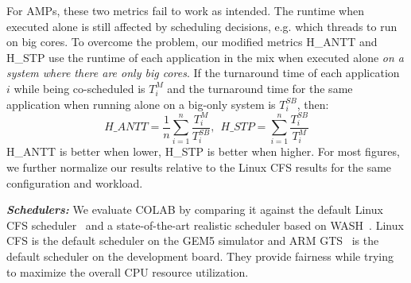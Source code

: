 For AMPs, these two metrics fail to work as intended. The runtime when executed alone is still affected by scheduling decisions, e.g. which threads to run on big cores. To overcome the problem, our modified metrics H\_ANTT and H\_STP use the runtime of each application in the mix when executed alone \emph{on a system where there are only big cores}. If the turnaround time of each application $i$ while being co-scheduled is $T^{M}_i$ and the turnaround time for the same application when running alone on a big-only system is $T^{SB}_i$, then:
$$ H\_ANTT = \frac{1}{n}\sum^{n}_{i=1}\frac{T^{M}_i}{T^{SB}_i}
,\ \ H\_STP = \sum^{n}_{i=1}\frac{T^{SB}_i}{T^{M}_i}$$
H\_ANTT is better when lower, H\_STP is better when higher. For most figures, we further normalize our results relative to the Linux CFS results for the same configuration and workload.

\textbf{\textit{Schedulers:}}
We evaluate COLAB by comparing it against the default Linux CFS scheduler~\cite{molnar2007cfs} and a state-of-the-art realistic scheduler based on WASH~\cite{jibaja2016portable}. 
Linux CFS is the default scheduler on the GEM5 simulator and ARM GTS~\cite{jeff2013big} is the default scheduler on the development board. They provide fairness while trying to maximize the overall CPU resource utilization.



